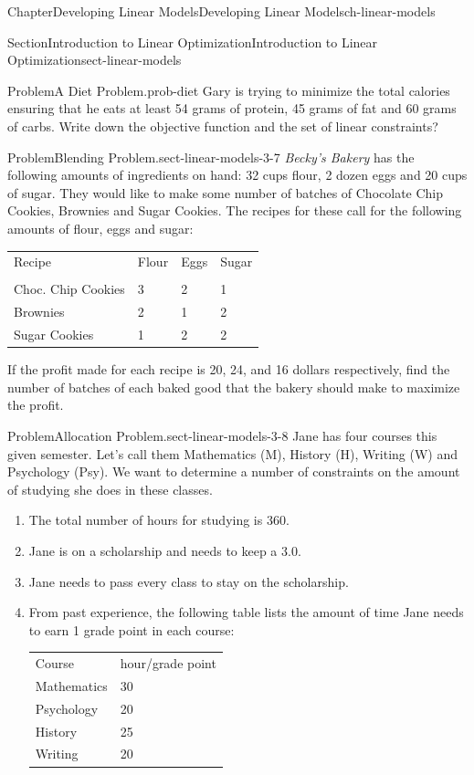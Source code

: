 \documentclass[oneside,10pt,]{book}
\newcommand{\tabularfont}{\relax}
\numberwithin{equation}{section}
\newcommand{\hrulemedium}{\noalign{\hrule height 0.07em}}
\begin{document}
\begin{chapterptx}{Chapter}{Developing Linear Models}{}{Developing Linear Models}{}{}{ch-linear-models}
\begin{sectionptx}{Section}{Introduction to Linear Optimization}{}{Introduction to Linear Optimization}{}{}{sect-linear-models}
\begin{introduction}{}
\begin{problem}{Problem}{A Diet Problem.}{prob-diet}
Gary is trying to minimize the total calories ensuring that he eats at least 54 grams of protein, 45 grams of fat and 60 grams of carbs. Write down the objective function and the set of linear constraints?%
\end{problem}
\begin{problem}{Problem}{Blending Problem.}{sect-linear-models-3-7}%
\emph{Becky’s Bakery} has the following amounts of ingredients on hand: 32 cups flour, 2 dozen eggs and 20 cups of sugar. They would like to make some number of batches of Chocolate Chip Cookies, Brownies and Sugar Cookies. The recipes for these call for the following amounts of flour, eggs and sugar:%
\begin{center}%
{\tabularfont%
\begin{tabular}{llll}
Recipe&Flour&Eggs&Sugar\tabularnewline\hrulemedium
\tabularnewline[0pt]
Choc. Chip Cookies&3&2&1\tabularnewline[0pt]
Brownies&2&1&2\tabularnewline[0pt]
Sugar Cookies&1&2&2
\end{tabular}
}%
\end{center}%
If the profit made for each recipe is 20, 24, and 16 dollars respectively, find the number of batches of each baked good that the bakery should make to maximize the profit.%
\end{problem}
\begin{problem}{Problem}{Allocation Problem.}{sect-linear-models-3-8}%
Jane has four courses this given semester. Let's call them Mathematics (M), History (H), Writing (W) and Psychology (Psy). We want to determine a number of constraints on the amount of studying she does in these classes.%
\par
%
\begin{enumerate}
\item{}The total number of hours for studying is 360.%
\item{}Jane is on a scholarship and needs to keep a 3.0.%
\item{}Jane needs to pass every class to stay on the scholarship.%
\item{}From past experience, the following table lists the amount of time Jane needs to earn 1 grade point in each course:%
\begin{center}%
{\tabularfont%
\begin{tabular}{ll}
Course&hour\slash{}grade point\tabularnewline\hrulemedium
Mathematics&30\tabularnewline[0pt]
Psychology&20\tabularnewline[0pt]
History&25\tabularnewline[0pt]
Writing&20
\end{tabular}
}%
\end{center}%

\end{enumerate}
\end{problem}
\end{introduction}
\end{sectionptx}
\end{chapterptx}
\end{document}
